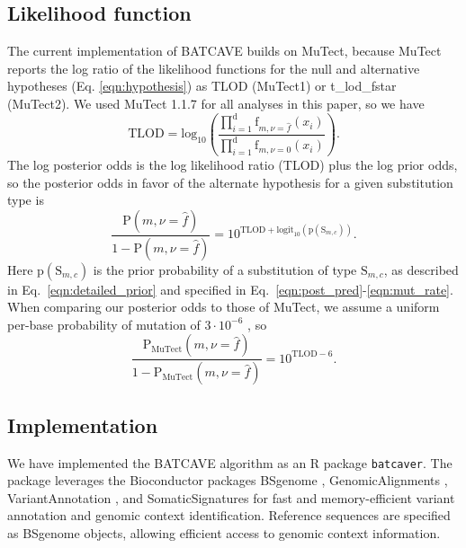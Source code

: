 \documentclass[a4,center,fleqn]{NAR}
\newcommand{\batcave}{BATCAVE\xspace}
\begin{document}
\subsection{Likelihood function}
The current implementation of \batcave builds on MuTect, because MuTect reports the log ratio of the likelihood functions for the null and alternative hypotheses (Eq. \ref{eqn:hypothesis}) as \textrm{TLOD} (MuTect1) or \textrm{t\_lod\_fstar} (MuTect2).
We used MuTect 1.1.7 for all analyses in this paper, so we have
\begin{equation}
  \label{eqn:tlod}
    \mathrm{TLOD} = \mathrm{log}_{10}\left(\frac{\prod_{i=1}^{\mathrm{d}} \textrm{f}_{m,\nu = \hat{f}}(x_i)}{\prod_{i=1}^{\mathrm{d}} \textrm{f}_{m,\nu = 0}(x_i)}\right).
\end{equation}
The log posterior odds is the log likelihood ratio (\textrm{TLOD}) plus the log prior odds, so the posterior odds in favor of the alternate hypothesis for a given substitution type is
\begin{equation}
  \label{eqn:computed_posterior}
  \frac{\mathrm{P}(m,\nu = \hat{f})}{1 - \mathrm{P}(m,\nu = \hat{f})} = 10^{\mathrm{TLOD} + \mathrm{logit}_{10}(\mathrm{p}(\mathrm{S}_{m,c}))}.
\end{equation}
Here $\mathrm{p}(\mathrm{S}_{m,c})$ is the prior probability of a substitution of type $\mathrm{S}_{m,c}$, as described in Eq.~\ref{eqn:detailed_prior} and specified in Eq.~\ref{eqn:post_pred}-\ref{eqn:mut_rate}.
When comparing our posterior odds to those of MuTect, we assume a uniform per-base probability of mutation of $3\cdot10^{-6}$ \cite{Cibulskis2013}, so
\begin{equation}  \label{eqn:mutect_posterior}
  \frac{\mathrm{P}_\mathrm{MuTect}(m,\nu = \hat{f})}{1 - \mathrm{P}_\mathrm{MuTect}(m,\nu = \hat{f})} = 10^{\mathrm{TLOD} - 6}.
\end{equation}

\subsection{Implementation}
We have implemented the \batcave algorithm as an R package \texttt{batcaver}.
The package leverages the Bioconductor packages \textrm{BSgenome} \cite{Pages2019}, \textrm{GenomicAlignments} \cite{Lawrence2013}, \textrm{VariantAnnotation} \cite{Obenchain2014}, and \textrm{SomaticSignatures} \cite{Gehring2015} for fast and memory-efficient variant annotation and genomic context identification.
Reference sequences are specified as BSgenome objects, allowing efficient access to genomic context information.
\end{document}
